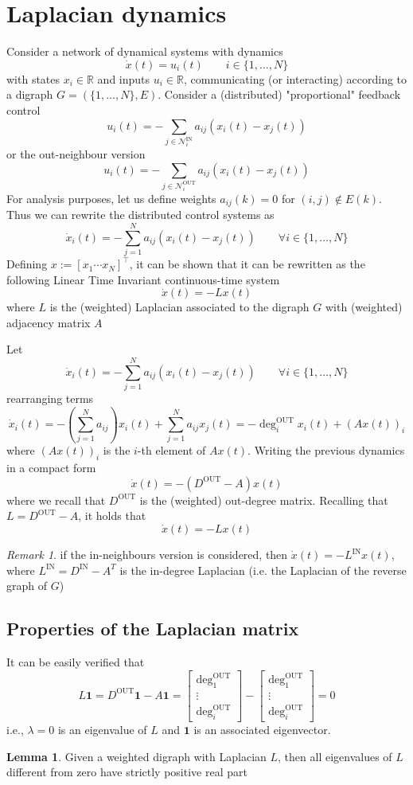 \documentclass{book}
\newcommand{\R}{\mathbb{R}}
\theoremstyle{theoremv2}
\theoremstyle{defv2}
\theoremstyle{remark}
\newtheorem*{remark}{Remark}
\theoremstyle{remark}
\theoremstyle{definition}
\newtheorem*{lemma}{Lemma}
\theoremstyle{definition}
\begin{document}
\section{Laplacian dynamics}
Consider a network of dynamical systems with dynamics 
\[
    \dot{x}(t) = u_i(t) \qquad i \in \{1,\dots,N\}
\]
with states $x_i\in\R$ and inputs $u_i\in\R$, communicating (or interacting) according to a digraph $G=(\{1,\dots,N\},E)$. Consider a (distributed) "proportional" feedback control 
\[
    u_i(t) = - \displaystyle\sum_{j\in\mathcal{N}_i^{\text{IN}}}a_{ij}(x_i(t)-x_j(t))
\]
or the out-neighbour version
\[
    u_i(t) = - \displaystyle\sum_{j\in\mathcal{N}_i^{\text{OUT}}}a_{ij}(x_i(t)-x_j(t))
\]
For analysis purposes, let us define weights $a_{ij}(k)=0$ for $(i,j)\notin E(k)$. Thus we can rewrite the distributed control systems as 
\[
    \dot{x}_i(t) = - \displaystyle\sum_{j=1}^{N} a_{ij} (x_i(t)-x_j(t)) \qquad \forall i\in\{1,\dots,N\}
\]
Defining $x:=[x_1 \cdots x_N]^\top$, it can be shown that it can be rewritten as the following Linear Time Invariant continuous-time system 
\[
    \dot{x}(t) = -Lx(t)
\]
where $L$ is the (weighted) Laplacian associated to the digraph $G$ with (weighted) adjacency matrix $A$ 

Let 
\[
    \dot{x}_i(t) = - \displaystyle\sum_{j=1}^{N} a_{ij} (x_i(t)-x_j(t)) \qquad \forall i\in\{1,\dots,N\}
\]
rearranging terms 
\[
    \dot{x}_i(t) = -\left(\displaystyle\sum_{j=1}^{N} a_{ij}\right) x_i(t) + \displaystyle\sum_{j=1}^{N} a_{ij}x_j(t) = -\deg_i^{\text{OUT}}x_i(t)+ (Ax(t))_i
\]
where $(Ax(t))_i$ is the $i$-th element of $Ax(t)$. Writing the previous dynamics in a compact form 
\[
    \dot{x}(t) = -(D^{\text{OUT}}-A)x(t)
\]
where we recall that $D^{\text{OUT}}$ is the (weighted) out-degree matrix. Recalling that $L=D^{\text{OUT}}-A$, it holds that 
\[
    \dot{x}(t) = -Lx(t)
\]
\begin{remark}
    if the in-neighbours version is considered, then $\dot{x}(t) = -L^{\text{IN}}x(t)$, where $L^{\text{IN}}=D^{\text{IN}}-A^T$ is the in-degree Laplacian (i.e. the Laplacian of the reverse graph of $G$)
\end{remark}
\subsection{Properties of the Laplacian matrix}
It can be easily verified that 
\[
    L\mathbf{1} = D^{\text{OUT}}\mathbf{1}-A\mathbf{1} = \begin{bmatrix}
        \deg_1^{\text{OUT}} \\ \vdots \\ \deg_i^{\text{OUT}}
    \end{bmatrix} - \begin{bmatrix}
        \deg_1^{\text{OUT}} \\ \vdots \\ \deg_i^{\text{OUT}}
    \end{bmatrix} = 0
\]
i.e., $\lambda=0$ is an eigenvalue of $L$ and $\mathbf{1}$ is an associated eigenvector.
\begin{lemma}
    Given a weighted digraph with Laplacian $L$, then all eigenvalues of $L$ different from zero have strictly positive real part
\end{lemma}
\end{document}
